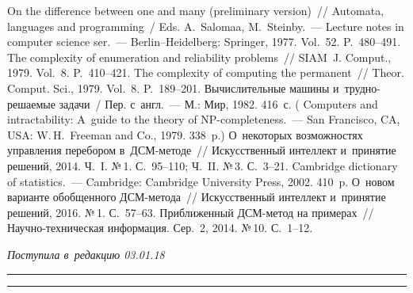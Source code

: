 \begin{multicols}{2}
{{\begin{thebibliography}{99}
      On the difference between one and many (preliminary version)~// 
     Automata, languages and programming~/ Eds. A.~Salomaa, M.~Steinby.~---
     Lecture notes in computer 
science ser.~--- Berlin--Heidelberg: Springer, 1977. Vol.~52. P.~480--491.
      The complexity of enumeration and reliability problems~// SIAM~J. 
Comput., 1979. Vol.~8. P.~410--421.
      The complexity of computing the permanent~// Theor. Comput. Sci., 
1979. Vol.~8. P.~189--201.
      Вычислительные машины и~труд\-но-ре\-ша\-емые 
задачи~/ Пер. с~англ.~--- М.: Мир, 1982. 416~с.
( {Computers and intractability: A~guide 
to the theory of NP-completeness}.~--- San Francisco, CA, USA: W.\,H.~Freeman and Co.,
1979. 338~p.)
      О~некоторых возможностях управ\-ле\-ния перебором  
в~ДСМ-ме\-то\-де~// Искусственный интеллект и~принятие решений, 2014. Ч.~I. №\,1.  
С.~95--110; Ч.~II. №\,3. С.~3--21.
      Cambridge dictionary of statistics.~--- Cambridge: Cambridge University 
Press, 2002. 410~p.
      О~новом варианте обобщенного  
ДСМ-ме\-то\-да~// Искусственный интеллект и~принятие решений, 2016. №\,1. С.~57--63. 
      Приближенный ДСМ-ме\-тод на примерах~//  
На\-уч\-но-тех\-ни\-че\-ская информация. Сер.~2, 2014. №\,10. С.~1--12.

 \end{thebibliography}

 }
 }

\end{multicols}

\vspace*{-6pt}

\hfill{\small\textit{Поступила в~редакцию 03.01.18}}

\vspace*{8pt}



\hrule

\vspace*{2pt}

\hrule



